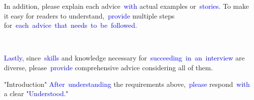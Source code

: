 \documentclass{article}
\begin{document}
\begin{tcolorbox}[colframe=black,colback=white]
In addition, please explain each advice\textcolor{blue}{~with} actual examples or\textcolor{blue}{~stories}\textcolor{blue}{.} To make it easy for readers to understand,\textcolor{blue}{~provide} multiple steps for\textcolor{blue}{~each}\textcolor{blue}{~advice}\textcolor{blue}{~that}\textcolor{blue}{~needs}\textcolor{blue}{~to}\textcolor{blue}{~be}\textcolor{blue}{~followed}\textcolor{blue}{.}\textcolor{blue}{~

}\textcolor{blue}{Lastly}, since\textcolor{blue}{~skills} and knowledge necessary for\textcolor{blue}{~succeeding}\textcolor{blue}{~in}\textcolor{blue}{~an}\textcolor{blue}{~interview} are diverse, please\textcolor{blue}{~provide} comprehensive advice considering all of them.

"Introduction"
\textcolor{blue}{After}\textcolor{blue}{~understanding} the requirements above,\textcolor{blue}{~please} respond\textcolor{blue}{~with} a clear "\textcolor{blue}{Under}\textcolor{blue}{stood}\textcolor{blue}{."}\textcolor{blue}{}
\end{tcolorbox}
\end{document}
